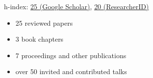 \documentclass{article}
\begin{document}
h-index: \href{http://scholar.google.com/citations?user=nwPxp24AAAAJ}{25 (Google Scholar)}, \href{https://www.webofscience.com/wos/author/record/G-4238-2010}{20 (ResearcherID)}
\begin{itemize}
\setlength{\itemsep}{0pt}
\setlength{\parskip}{0pt}
\setlength{\parsep}{0pt}
\item 25 reviewed papers
\item 3 book chapters
\item 7 proceedings and other publications
\item over 50 invited and contributed talks 
\end{itemize}

%
%
%
%
%
\end{document}

